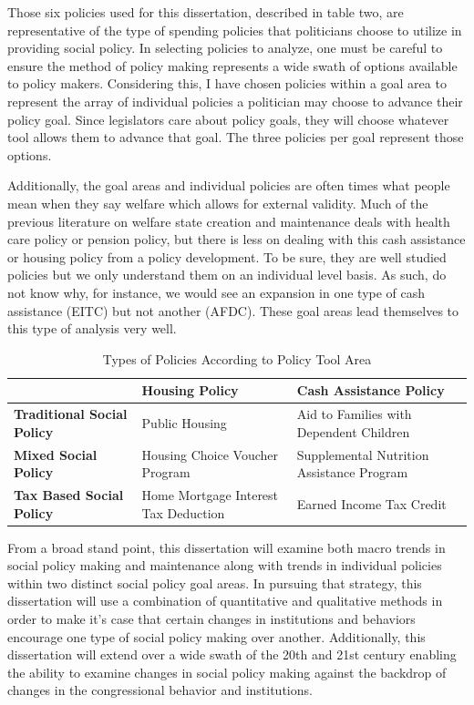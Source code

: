 \documentclass[12pt]{article}
\begin{document}
Those six policies used for this dissertation, described in table two, are representative of the type of spending policies that politicians choose to utilize in providing social policy. In selecting policies to analyze, one must be careful to ensure the method of policy making represents a wide swath of options available to policy makers. Considering this, I have chosen policies within a goal area to represent the array of individual policies a politician may choose to advance their policy goal. Since legislators care about policy goals, they will choose whatever tool allows them to advance that goal. The three policies per goal represent those options. 

Additionally, the goal areas and individual policies are often times what people mean when they say welfare which allows for external validity. Much of the previous literature on welfare state creation and maintenance deals with health care policy or pension policy, but there is less on dealing with this cash assistance or housing policy from a policy development. To be sure, they are well studied policies but we only understand them on an individual level basis. As such, do not know why, for instance, we would see an expansion in one type of cash assistance (EITC) but not another (AFDC). These goal areas lead themselves to this type of analysis very well.

\begin{table}
\centering
    \begin{tabularx}{\textwidth}{XXX} \toprule
           & \textbf{Housing Policy} & \textbf{Cash Assistance Policy} \\ \midrule
    \textbf{Traditional Social Policy} & Public Housing        & Aid to Families with Dependent Children \\
        \textbf{Mixed Social Policy} & Housing Choice Voucher Program        & Supplemental Nutrition Assistance Program \\
    \textbf{Tax Based Social Policy} & Home Mortgage Interest Tax Deduction        & Earned Income Tax Credit \\ \bottomrule
    \end{tabularx}
  \caption{Types of Policies According to Policy Tool Area}
  \label{tab:types}
\end{table}

From a broad stand point, this dissertation will examine both macro trends in social policy making and maintenance along with trends in individual policies within two distinct social policy goal areas. In pursuing that strategy, this dissertation will use a combination of quantitative and qualitative methods in order to make it's case that certain changes in institutions and behaviors encourage one type of social policy making over another. Additionally, this dissertation will extend over a wide swath of the 20th and 21st century enabling the ability to examine changes in social policy making against the backdrop of changes in the congressional behavior and institutions.
\end{document}
